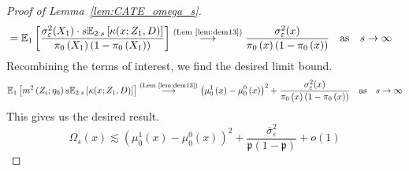 \begin{proof}[Proof of Lemma~\ref{lem:CATE_omega_s}]
\begin{equation}
\begin{aligned}
			 & = \mathbb{E}_{1}\left[\frac{\sigma_{\varepsilon}^2(X_1) \cdot s \mathbb{E}_{2:s}\left[\kappa(x; Z_1, D)\right]}{\pi_{0}\left(X_1\right)\left(1 - \pi_{0}\left(X_1\right)\right)}\right]
			\overset{\text{(Lem~\ref{lem:dem13})}}{\longrightarrow} \frac{\sigma_{\varepsilon}^2(x)}{\pi_{0}\left(x\right)\left(1 - \pi_{0}\left(x\right)\right)}
			\quad \text{as} \quad s \rightarrow \infty
		\end{aligned}
	\end{equation}
	Recombining the terms of interest, we find the desired limit bound.
	\begin{equation}
		\begin{aligned}
			\mathbb{E}_{1}\left[m^2\left(Z_{i}; \eta_{0}\right) s \mathbb{E}_{2:s}\left[\kappa(x; Z_1, D)\right]\right]
			\overset{\text{(Lem~\ref{lem:dem13})}}{\longrightarrow} \left(\mu_{0}^{1}\left(x\right) - \mu_{0}^{0}\left(x\right)\right)^2 + \frac{\sigma_{\varepsilon}^2(x)}{\pi_{0}\left(x\right)\left(1 - \pi_{0}\left(x\right)\right)}
			\quad \text{as} \quad s \rightarrow \infty
		\end{aligned}
	\end{equation}
    This gives us the desired result.
    \begin{equation}
        \Omega_{s}\left(x\right)
        \lesssim \left(\mu_{0}^{1}\left(x\right) - \mu_{0}^{0}\left(x\right)\right)^2 + \frac{\overline{\sigma}^2_{\varepsilon}}{\mathfrak{p}\left(1 - \mathfrak{p}\right)} + o(1)
    \end{equation}
\end{proof}

